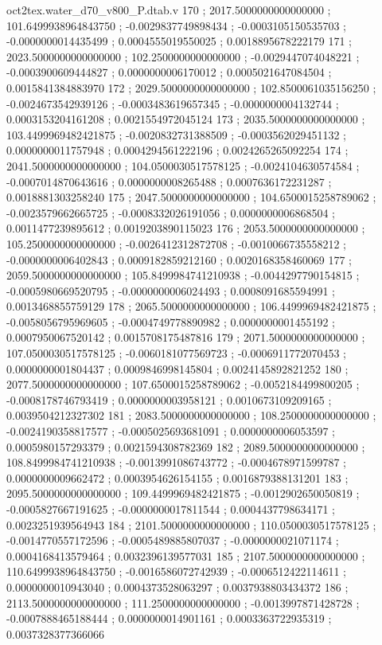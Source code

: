 \begin{filecontents}[overwrite]{oct2tex.water_d70_v800_P.dtab.v}
170 ; 2017.5000000000000000 ; 101.6499938964843750 ; -0.0029837749898434 ; -0.0003105150535703 ; -0.0000000014435499 ; 0.0004555019550025 ; 0.0018895678222179
171 ; 2023.5000000000000000 ; 102.2500000000000000 ; -0.0029447074048221 ; -0.0003900609444827 ; 0.0000000006170012 ; 0.0005021647084504 ; 0.0015841384883970
172 ; 2029.5000000000000000 ; 102.8500061035156250 ; -0.0024673542939126 ; -0.0003483619657345 ; -0.0000000004132744 ; 0.0003153204161208 ; 0.0021554972045124
173 ; 2035.5000000000000000 ; 103.4499969482421875 ; -0.0020832731388509 ; -0.0003562029451132 ; 0.0000000011757948 ; 0.0004294561222196 ; 0.0024265265092254
174 ; 2041.5000000000000000 ; 104.0500030517578125 ; -0.0024104630574584 ; -0.0007014870643616 ; 0.0000000008265488 ; 0.0007636172231287 ; 0.0018881303258240
175 ; 2047.5000000000000000 ; 104.6500015258789062 ; -0.0023579662665725 ; -0.0008332026191056 ; 0.0000000006868504 ; 0.0011477239895612 ; 0.0019203890115023
176 ; 2053.5000000000000000 ; 105.2500000000000000 ; -0.0026412312872708 ; -0.0010066735558212 ; -0.0000000006402843 ; 0.0009182859212160 ; 0.0020168358460069
177 ; 2059.5000000000000000 ; 105.8499984741210938 ; -0.0044297790154815 ; -0.0005980669520795 ; -0.0000000006024493 ; 0.0008091685594991 ; 0.0013468855759129
178 ; 2065.5000000000000000 ; 106.4499969482421875 ; -0.0058056795969605 ; -0.0004749778890982 ; 0.0000000001455192 ; 0.0007950067520142 ; 0.0015708175487816
179 ; 2071.5000000000000000 ; 107.0500030517578125 ; -0.0060181077569723 ; -0.0006911772070453 ; 0.0000000001804437 ; 0.0009846998145804 ; 0.0024145892821252
180 ; 2077.5000000000000000 ; 107.6500015258789062 ; -0.0052184499800205 ; -0.0008178746793419 ; 0.0000000003958121 ; 0.0010673109209165 ; 0.0039504212327302
181 ; 2083.5000000000000000 ; 108.2500000000000000 ; -0.0024190358817577 ; -0.0005025693681091 ; 0.0000000006053597 ; 0.0005980157293379 ; 0.0021594308782369
182 ; 2089.5000000000000000 ; 108.8499984741210938 ; -0.0013991086743772 ; -0.0004678971599787 ; 0.0000000009662472 ; 0.0003954626154155 ; 0.0016879388131201
183 ; 2095.5000000000000000 ; 109.4499969482421875 ; -0.0012902650050819 ; -0.0005827667191625 ; -0.0000000017811544 ; 0.0004437798634171 ; 0.0023251939564943
184 ; 2101.5000000000000000 ; 110.0500030517578125 ; -0.0014770557172596 ; -0.0005489885807037 ; -0.0000000021071174 ; 0.0004168413579464 ; 0.0032396139577031
185 ; 2107.5000000000000000 ; 110.6499938964843750 ; -0.0016586072742939 ; -0.0006512422114611 ; 0.0000000010943040 ; 0.0004373528063297 ; 0.0037938803434372
186 ; 2113.5000000000000000 ; 111.2500000000000000 ; -0.0013997871428728 ; -0.0007888465188444 ; 0.0000000014901161 ; 0.0003363722935319 ; 0.0037328377366066

\end{filecontents}
